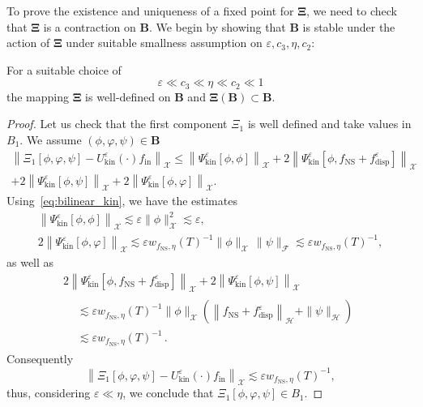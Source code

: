 \documentclass[AHL,Unicode,longabstracts,published]{cedram}
\newcommand{\ini}{\mathrm{in}}
\newcommand{\ns}{\mathrm{NS}}
\newcommand{\kin}{\mathrm{kin}}
\newcommand{\disp}{\mathrm{disp}}
\newcommand{\FFF}{\mathscr{F}}
\newcommand{\HHH}{\mathscr{H}}
\newcommand{\GGG}{\mathscr{X}}
\newcommand{\SSSs}{\HHH}
\newcommand{\SSSl}{\GGG}
\newcommand{\SSSm}{\FFF}
\renewcommand*\le{\leqslant}
\newcommand*\eps{{\varepsilon}}
\begin{document}
To prove the existence and uniqueness of a fixed point for $\bm{\Xi}$, we need to check that $\bm{\Xi}$ is a contraction on $\bm{B}$. We begin by showing that $\bm{B}$ is stable under the action of $\bm{\Xi}$ under suitable smallness assumption on $\eps,c_3,\eta,c_2$:
\begin{lemm}\label{lemm6.5}
For a suitable choice of
\[
\eps \ll c_3 \ll \eta \ll c_2 \ll 1
\]
the mapping $\bm{\Xi}$ is well-defined on $\bm{B}$ and $\bm{\Xi}(\bm{B}) \subset \bm{B}.$
\end{lemm}

\begin{proof}
Let us check that the first component $\Xi_1$ is well defined and take values in $B_1$. We assume $(\phi,\varphi,\psi) \in \bm{B}$
\begin{multline*}
\left\| \Xi_1\left[\phi, \varphi, \psi\right] - U^\eps_\kin(\cdot) f_\ini \right\|_{\SSSl} \le  \left\| \Psi^\eps_\kin\left[\phi, \phi\right] \right\|_{\SSSl} + 2 \left\| \Psi^\eps_\kin\left[\phi, f_\ns + f^\eps_\disp \right] \right\|_{\SSSl} \\
 + 2 \left\| \Psi^\eps_\kin\left[\phi, \psi\right] \right\|_{ \SSSl } + 2 \left\| \Psi^\eps_\kin\left[\phi, \varphi\right] \right\|_{ \SSSl }.
\end{multline*}
Using~\eqref{eq:bilinear_kin}, we have the estimates
\begin{gather*}
\left\| \Psi^\eps_\kin\left[\phi, \phi\right] \right\|_{\SSSl} \lesssim \eps \| \phi\|_{\SSSl}^2 \lesssim \eps,
\\
2 \left\| \Psi^\eps_\kin \left[\phi, \varphi\right] \right\|_{ \SSSl }  \lesssim \eps w_{f_\ns, \eta }(T)^{-1}\| \phi\|_{\SSSl}\,\| \psi\|_{\SSSm} \lesssim \eps w_{f_\ns, \eta }(T)^{-1},
\end{gather*}
as well as
\begin{multline*}
2 \left\| \Psi^\eps_\kin\left[\phi, f_\ns + f^\eps_\disp \right] \right\|_{\SSSl} + 2 \left\| \Psi^\eps_\kin\left[\phi, \psi\right]\right\|_{ \SSSl }\\
\begin{aligned}
&\lesssim \eps w_{f_\ns,\eta}(T)^{-1}\| \phi\|_{\SSSl}\left(\left\| f_\ns +f^\eps_\disp \right\|_{\SSSs} + \| \psi \|_{\SSSs} \right)
\\
&\lesssim \eps w_{f_\ns, \eta}(T)^{-1}\,.
\end{aligned}
\end{multline*}
Consequently
\[
\left\| \Xi_1\left[\phi, \varphi, \psi\right] - U^\eps_\kin(\cdot) f_\ini \right\|_{\SSSl} \lesssim \eps w_{f_\ns, \eta}(T)^{-1},
\]
thus, considering $\eps \ll \eta$, we conclude that $\Xi_1[\phi,\varphi,\psi] \in B_1$.


\end{proof}
\end{document}
